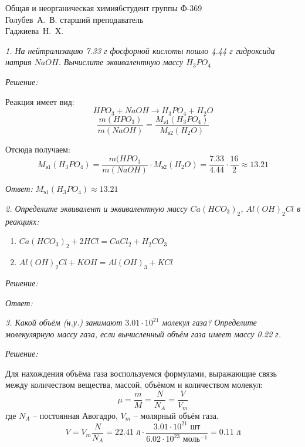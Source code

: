 





{Общая и неорганическая химия}{}{6}{студент группы Ф-369\\Голубев~А.~В.}
{}{старший преподаватель \\Гаджиева~Н.~Х.}{}{}

\pagebreak

\emph{1. На нейтрализацию 7.33 г фосфорной кислоты пошло 4.44 г 
гидроксида натрия \( NaOH \). Вычислите эквивалентную массу 
\( H_3 PO_4 \)}

\emph{Решение:}

Реакция имеет вид:
\[
	HPO_3 + NaOH \rightarrow H_3 PO_4 + H_2 O
\]
\[
	\frac{m(HPO_3)}{m(NaOH)} = \frac{M_\text{э1}(H_3 PO_4)}{M_\text{э2}(H_2 O)}
\]

Отсюда получаем:
\[
	M_\text{э1}(H_3 PO_4) = \frac{m(HPO_3}{m(NaOH)}\cdot M_\text{э2}(H_2 O) =
	\frac{7.33}{4.44}\cdot\frac{16}{2} \approx 13.21
\]

\emph{Ответ: } \( M_\text{э1}(H_3 PO_4) \approx 13.21 \)

\pagebreak

\emph{2. Определите эквивалент и эквивалентную массу \( Ca(HCO_3)_2 \), 
\( Al(OH)_2Cl \) в реакциях:}
\begin{enumerate}
    \item \( Ca(HCO_3)_2 + 2HCl = CaCl_2 + H_2CO_3 \)
    \item \( Al(OH)_2Cl + KOH = Al(OH)_3 + KCl \)
\end{enumerate}

\emph{Решение:}

\emph{Ответ: }

\pagebreak

\emph{3. Какой объём (н.у.) занимают \( 3.01\cdot10^{21} \) молекул 
газа? Определите молекулярную массу газа, если вычисленный объём газа 
имеет массу 0.22 г.}

\emph{Решение:}

Для нахождения объёма газа воспользуемся формулами, выражающие связь 
между количеством вещества, массой, объёмом и количеством молекул:
\[
	\mu = \frac{m}{M} = \frac{N}{N_A} = \frac{V}{V_m}
\]
где \( N_A \) -- постоянная Авогадро, \( V_m \) -- молярный объём газа.
\[
	V = V_m \frac{N}{N_A} = 22.41 \text{ л} \cdot 
	\frac{3.01\cdot10^{21} \text{ шт}}{6.02\cdot10^{23} \text{ моль}^{-1}} =
	0.11 \text{ л}
\]

